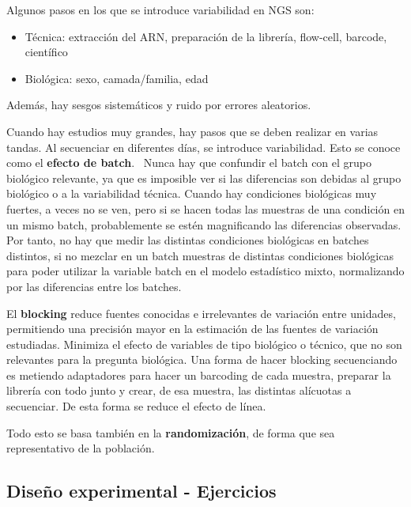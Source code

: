 Algunos pasos en los que se introduce variabilidad en NGS son:
\begin{itemize}
\item Técnica: extracción del ARN, preparación de la librería, flow-cell, barcode, científico
\item Biológica: sexo, camada/familia, edad
\end{itemize}
Además, hay sesgos sistemáticos y ruido por errores aleatorios.

Cuando hay estudios muy grandes, hay pasos que se deben realizar en varias tandas. Al secuenciar en diferentes días, se introduce variabilidad. Esto se conoce como el \textbf{efecto de batch}. \marginpar[\footnotesize !!!!!]  \ Nunca hay que confundir el batch con el grupo biológico relevante, ya que es imposible ver si las diferencias son debidas al grupo biológico o a la variabilidad técnica. Cuando hay condiciones biológicas muy fuertes, a veces no se ven, pero si se hacen todas las muestras de una condición en un mismo batch, probablemente se estén magnificando las diferencias observadas. Por tanto, no hay que medir las distintas condiciones biológicas en batches distintos, si no mezclar en un batch muestras de distintas condiciones biológicas para poder utilizar la variable batch en el modelo estadístico mixto, normalizando por las diferencias entre los batches.

El \textbf{blocking} reduce fuentes conocidas e irrelevantes de variación entre unidades, permitiendo una precisión mayor en la estimación de las fuentes de variación estudiadas. Minimiza el efecto de variables de tipo biológico o técnico, que no son relevantes para la pregunta biológica. Una forma de hacer blocking secuenciando es metiendo adaptadores para hacer un barcoding de cada muestra, preparar la librería con todo junto y crear, de esa muestra, las distintas alícuotas a secuenciar. De esta forma se reduce el efecto de línea.

Todo esto se basa también en la \textbf{randomización}, de forma que sea representativo de la población. 

\subsection{Diseño experimental - Ejercicios}
